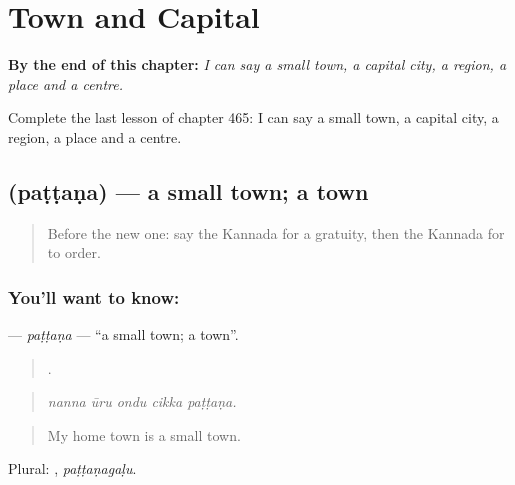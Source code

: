 
\chapter{Town and Capital}
\label{ch:ka-town-and-capital}

\begin{chapteropening}
\textbf{By the end of this chapter:} \emph{I can say a small town, a capital city, a region, a place and a centre.}

Complete the last lesson of chapter 465: I can say a small town, a capital city, a region, a place and a centre.
\end{chapteropening}

\section[\texorpdfstring{\kn{ಪಟ್ಟಣ} (paṭṭaṇa)}{ಪಟ್ಟಣ (paṭṭaṇa)}]{ (paṭṭaṇa) — a small town; a town}

\label{lesson:KA-C465-pattana}



\begin{quote}
Before the new one: say the Kannada for a gratuity, then the Kannada for to order.
\end{quote}

\subsection*{You'll want to know: }
\textbf{} — \emph{paṭṭaṇa} — \textquotedblleft{}a small town; a town\textquotedblright{}.

\begin{quote}
    .
\end{quote}

\begin{quote}
\emph{nanna ūru ondu cikka paṭṭaṇa.}
\end{quote}

\begin{quote}
My home town is a small town.
\end{quote}

Plural: , \emph{paṭṭaṇagaḷu}.

